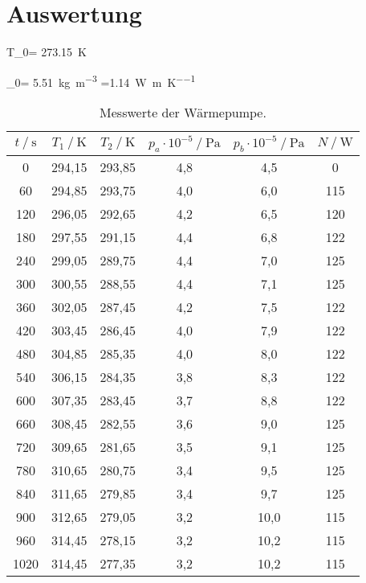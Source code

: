 \section{Auswertung}
\label{sec:Auswertung}



T_0= \qty{273.15}{\kelvin}

\rho_0= \qty{5.51}{\kilo\gram\per\cubic\meter}
\kappa=\qty{1.14}{\watt\per\meter\per\kelvin}

\begin{table}[H]
	\centering
	\caption{Messwerte der Wärmepumpe.}
	\label{tab:Tab1}
	\begin{tabular}{S[table-format=4.0] S S S[table-format=1.1] S[table-format=2.1] S[table-format=3.0]}
		\toprule
      {$t \mathbin{/} \si{\second}$}&{$T_1 \mathbin{/} \si{\kelvin}$}&{$T_2 \mathbin{/} \si{\kelvin}$}&{$p_a \cdot 10^{-5} \mathbin{/} \si{\pascal}$}&{$p_b \cdot 10^{-5} \mathbin{/} \si{\pascal}$} &
      {$N \mathbin{/} \si{\watt}$}\\
     & 294,15 & 293,85 & 4,8 & 4,5 & 0\\
      60 & 294,85 & 293,75 & 4,0 & 6,0 & 115\\
      120 & 296,05 & 292,65 & 4,2 & 6,5 & 120\\
      180 & 297,55 & 291,15 & 4,4 & 6,8 & 122\\
      240 & 299,05 & 289,75 & 4,4 & 7,0 & 125\\
      300 & 300,55 & 288,55 & 4,4 & 7,1 & 125\\
      360 & 302,05 & 287,45 & 4,2 & 7,5 & 122\\
      420 & 303,45 & 286,45 & 4,0 & 7,9 & 122\\
      480 & 304,85 & 285,35 & 4,0 & 8,0 & 122\\
      540 & 306,15 & 284,35 & 3,8 & 8,3 & 122\\
      600 & 307,35 & 283,45 & 3,7 & 8,8 & 122\\
      660 & 308,45 & 282,55 & 3,6 & 9,0 & 125\\
      720 & 309,65 & 281,65 & 3,5 & 9,1 & 125\\
      780 & 310,65 & 280,75 & 3,4 & 9,5 & 125\\
      840 & 311,65 & 279,85 & 3,4 & 9,7 & 125\\
      900 & 312,65 & 279,05 & 3,2 & 10,0 & 115\\
      960 & 314,45 & 278,15 & 3,2 & 10,2 & 115\\
      1020 & 314,45 & 277,35 & 3,2 & 10,2 & 115\\

\end{tabular}
\end{table}
